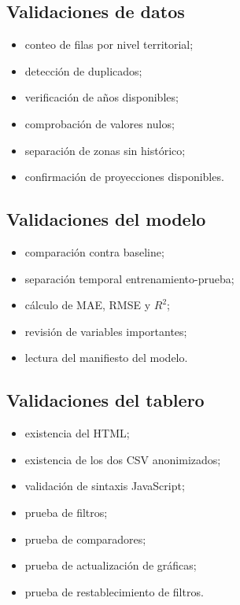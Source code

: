 \documentclass[11pt,a4paper]{article}
\begin{document}
\subsection{Validaciones de datos}

\begin{itemize}
    \item conteo de filas por nivel territorial;
    \item detección de duplicados;
    \item verificación de años disponibles;
    \item comprobación de valores nulos;
    \item separación de zonas sin histórico;
    \item confirmación de proyecciones disponibles.
\end{itemize}

\subsection{Validaciones del modelo}

\begin{itemize}
    \item comparación contra baseline;
    \item separación temporal entrenamiento-prueba;
    \item cálculo de MAE, RMSE y $R^2$;
    \item revisión de variables importantes;
    \item lectura del manifiesto del modelo.
\end{itemize}

\subsection{Validaciones del tablero}

\begin{itemize}
    \item existencia del HTML;
    \item existencia de los dos CSV anonimizados;
    \item validación de sintaxis JavaScript;
    \item prueba de filtros;
    \item prueba de comparadores;
    \item prueba de actualización de gráficas;
    \item prueba de restablecimiento de filtros.
\end{itemize}
\end{document}
